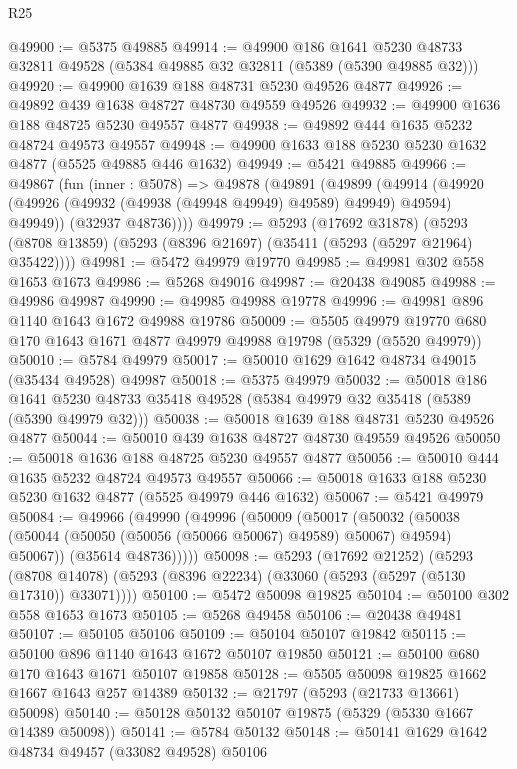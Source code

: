 \begin{lexlean}{R25}
\begin{coremodule}
@49900 := @5375 @49885
@49914 := @49900
    @186
    @1641
    @5230
    @48733
    @32811
    @49528
    (@5384 @49885 @32 @32811 (@5389 (@5390 @49885 @32)))
@49920 := @49900 @1639 @188 @48731 @5230 @49526 @4877
@49926 := @49892 @439 @1638 @48727 @48730 @49559 @49526
@49932 := @49900 @1636 @188 @48725 @5230 @49557 @4877
@49938 := @49892 @444 @1635 @5232 @48724 @49573 @49557
@49948 := @49900 @1633 @188 @5230 @5230 @1632 @4877 (@5525 @49885 @446 @1632)
@49949 := @5421 @49885
@49966 := @49867
    (fun (inner : @5078) =>
    @49878
      (@49891
        (@49899
          (@49914 (@49920 (@49926 (@49932 (@49938 (@49948 @49949) @49589) @49949) @49594) @49949))
          (@32937 @48736))))
@49979 := @5293
    (@17692 @31878)
    (@5293 (@8708 @13859) (@5293 (@8396 @21697) (@35411 (@5293 (@5297 @21964) @35422))))
@49981 := @5472 @49979 @19770
@49985 := @49981 @302 @558 @1653 @1673
@49986 := @5268 @49016
@49987 := @20438 @49085
@49988 := @49986 @49987
@49990 := @49985 @49988 @19778
@49996 := @49981 @896 @1140 @1643 @1672 @49988 @19786
@50009 := @5505
    @49979
    @19770
    @680
    @170
    @1643
    @1671
    @4877
    @49979
    @49988
    @19798
    (@5329 (@5520 @49979))
@50010 := @5784 @49979
@50017 := @50010 @1629 @1642 @48734 @49015 (@35434 @49528) @49987
@50018 := @5375 @49979
@50032 := @50018
    @186
    @1641
    @5230
    @48733
    @35418
    @49528
    (@5384 @49979 @32 @35418 (@5389 (@5390 @49979 @32)))
@50038 := @50018 @1639 @188 @48731 @5230 @49526 @4877
@50044 := @50010 @439 @1638 @48727 @48730 @49559 @49526
@50050 := @50018 @1636 @188 @48725 @5230 @49557 @4877
@50056 := @50010 @444 @1635 @5232 @48724 @49573 @49557
@50066 := @50018 @1633 @188 @5230 @5230 @1632 @4877 (@5525 @49979 @446 @1632)
@50067 := @5421 @49979
@50084 := @49966
    (@49990
      (@49996
        (@50009
          (@50017
            (@50032 (@50038 (@50044 (@50050 (@50056 (@50066 @50067) @49589) @50067) @49594) @50067))
            (@35614 @48736)))))
@50098 := @5293
    (@17692 @21252)
    (@5293 (@8708 @14078) (@5293 (@8396 @22234) (@33060 (@5293 (@5297 (@5130 @17310)) @33071))))
@50100 := @5472 @50098 @19825
@50104 := @50100 @302 @558 @1653 @1673
@50105 := @5268 @49458
@50106 := @20438 @49481
@50107 := @50105 @50106
@50109 := @50104 @50107 @19842
@50115 := @50100 @896 @1140 @1643 @1672 @50107 @19850
@50121 := @50100 @680 @170 @1643 @1671 @50107 @19858
@50128 := @5505 @50098 @19825 @1662 @1667 @1643 @257 @14389
@50132 := @21797 (@5293 (@21733 @13661) @50098)
@50140 := @50128 @50132 @50107 @19875 (@5329 (@5330 @1667 @14389 @50098))
@50141 := @5784 @50132
@50148 := @50141 @1629 @1642 @48734 @49457 (@33082 @49528) @50106

\end{coremodule}
\end{lexlean}

